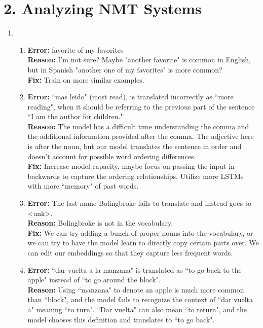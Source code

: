 \documentclass{article}
\begin{document}
\section*{2. Analyzing NMT Systems}
\begin{enumerate}[label=(\alph*)]
    \item
    \begin{enumerate}[label=\roman*.]
        \item 
        \textbf{Error:} favorite of my favorites \\
        \textbf{Reason:} I'm not sure? Maybe "another favorite" is common in English, but in Spanish "another one of my favorites" is more common? \\
        \textbf{Fix:} Train on more similar examples.
        \item 
        \textbf{Error:} ``mas leido" (most read), is translated incorrectly as ``more reading", when it should be referring to the previous part of the sentence ``I am the author for children." \\
        \textbf{Reason:} The model has a difficult time understanding the comma and the additional information provided after the comma. The adjective here is after the noun, but our model translates the sentence in order and doesn't account for possible word ordering differences. \\
        \textbf{Fix:} Increase model capacity, maybe focus on passing the input in backwards to capture the ordering relationships. Utilize more LSTMs with more ``memory" of past words.
        \item
        \textbf{Error:} The last name Bolingbroke fails to translate and instead goes to \textless unk\textgreater. \\
        \textbf{Reason:} Bolingbroke is not in the vocabulary. \\
        \textbf{Fix:} We can try adding a bunch of proper nouns into the vocabulary, or we can try to have the model learn to directly copy certain parts over. We can edit our embeddings so that they capture less frequent words.
        \item
        \textbf{Error:} ``dar vuelta a la manzana" is translated as ``to go back to the apple" instead of ``to go around the block". \\
        \textbf{Reason:} Using ``manzana" to denote an apple is much more common than ``block", and the model fails to recognize the context of ``dar vuelta a" meaning ``to turn". ``Dar vuelta" can also mean ``to return", and the model chooses this definition and translates to ``to go back". \\

\end{enumerate}
\end{enumerate}
\end{document}
